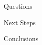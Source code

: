 \documentclass{beamer}
\newlength{\sepwidth}
\newlength{\colwidth}
\newcommand{\separatorcolumn}{\begin{column}{\sepwidth}\end{column}}
\begin{document}
\begin{frame}[t]
\begin{columns}[t]
\separatorcolumn

\begin{column}{\colwidth}

  \begin{block}{Questions}



  \end{block}
  \begin{block}{Next Steps}

  \end{block}
  \begin{block}{Conclusions}

  \end{block}





\end{column}

\separatorcolumn
\end{columns}
\end{frame}
\end{document}
